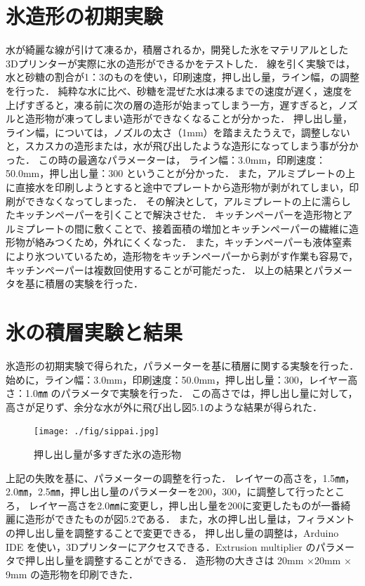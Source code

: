 \section{氷造形の初期実験}
\label{sec:paragraph}
水が綺麗な線が引けて凍るか，積層されるか，開発した氷をマテリアルとした3Dプリンターが実際に氷の造形ができるかをテストした．
線を引く実験では，水と砂糖の割合が1：3のものを使い，印刷速度，押し出し量，ライン幅，の調整を行った．
純粋な水に比べ、砂糖を混ぜた水は凍るまでの速度が遅く，速度を上げすぎると，凍る前に次の層の造形が始まってしまう一方，遅すぎると，ノズルと造形物が凍ってしまい造形ができなくなることが分かった．
押し出し量，ライン幅，については，ノズルの太さ（1mm）を踏まえたうえで，調整しないと，スカスカの造形または，水が飛び出したような造形になってしまう事が分かった．
この時の最適なパラメーターは， ライン幅：3.0mm，印刷速度：50.0mm，押し出し量：300 ということが分かった．
また，アルミプレートの上に直接水を印刷しようとすると途中でプレートから造形物が剥がれてしまい，印刷ができなくなってしまった．
その解決として，アルミプレートの上に濡らしたキッチンペーパーを引くことで解決させた．
キッチンペーパーを造形物とアルミプレートの間に敷くことで、接着面積の増加とキッチンペーパーの繊維に造形物が絡みつくため，外れにくくなった．
また，キッチンペーパーも液体窒素により氷ついているため，造形物をキッチンペーパーから剥がす作業も容易で，キッチンペーパーは複数回使用することが可能だった．
以上の結果とパラメータを基に積層の実験を行った．

\section{氷の積層実験と結果}
\label{sec:paragraph}
氷造形の初期実験で得られた，パラメーターを基に積層に関する実験を行った．
始めに，ライン幅：3.0mm，印刷速度：50.0mm，押し出し量：300，レイヤー高さ：1.0㎜ のパラメータで実験を行った．
この高さでは，押し出し量に対して，高さが足りず、余分な水が外に飛び出し図5.1のような結果が得られた．

\begin{figure}[H]
    \centering
    \texttt{[image: ./fig/sippai.jpg]}
    \caption{押し出し量が多すぎた氷の造形物}
    \label{fig:printer2}
  \end{figure}

上記の失敗を基に、パラメーターの調整を行った．
レイヤーの高さを，1.5㎜，2.0㎜，2.5㎜，押し出し量のパラメーターを200，300，に調整して行ったところ，
レイヤー高さを2.0㎜に変更し，押し出し量を200に変更したものが一番綺麗に造形ができたものが図5.2である．
また，水の押し出し量は，フィラメントの押し出し量を調整することで変更できる，
押し出し量の調整は，Arduino IDE を使い，3Dプリンターにアクセスできる．Extrusion multiplier のパラメータで押し出し量を調整することができる．
造形物の大きさは 20mm ×20mm × 9mm の造形物を印刷できた．

